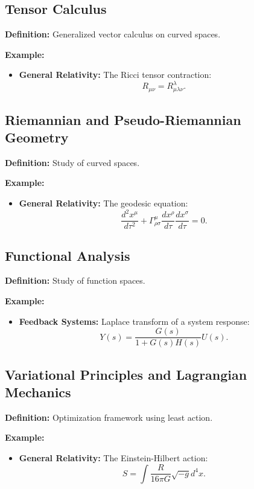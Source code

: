 \subsection{Tensor Calculus}
\textbf{Definition:} Generalized vector calculus on curved spaces.

\textbf{Example:}
\begin{itemize}
    \item \textbf{General Relativity:} The Ricci tensor contraction:
    \[
    R_{\mu\nu} = R^\lambda_{\mu\lambda\nu}.
    \]
\end{itemize}

\subsection{Riemannian and Pseudo-Riemannian Geometry}
\textbf{Definition:} Study of curved spaces.

\textbf{Example:}
\begin{itemize}
    \item \textbf{General Relativity:} The geodesic equation:
    \[
    \frac{d^2 x^\mu}{d\tau^2} + \Gamma^\mu_{\rho\sigma} \frac{dx^\rho}{d\tau} \frac{dx^\sigma}{d\tau} = 0.
    \]
\end{itemize}

\subsection{Functional Analysis}
\textbf{Definition:} Study of function spaces.

\textbf{Example:}
\begin{itemize}
    \item \textbf{Feedback Systems:} Laplace transform of a system response:
    \[
    Y(s) = \frac{G(s)}{1 + G(s)H(s)} U(s).
    \]
\end{itemize}

\subsection{Variational Principles and Lagrangian Mechanics}
\textbf{Definition:} Optimization framework using least action.

\textbf{Example:}
\begin{itemize}
    \item \textbf{General Relativity:} The Einstein-Hilbert action:
    \[
    S = \int \frac{R}{16\pi G} \sqrt{-g} d^4x.
    \]
\end{itemize}

